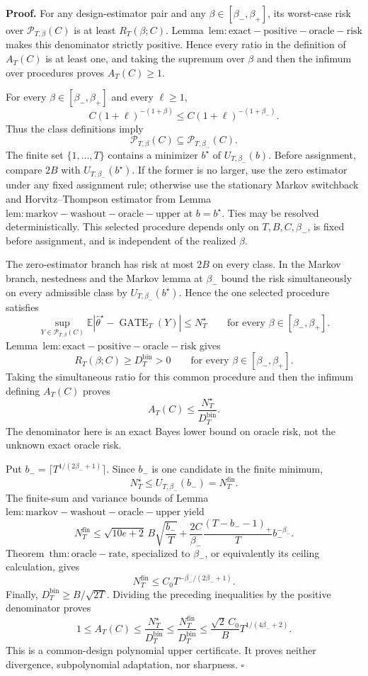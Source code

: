 \textbf{Proof.} For any design-estimator pair and any \(\beta\in[\beta_-,\beta_+]\), its worst-case risk over \(\mathcal P_{T,\beta}(C)\) is at least \(R_T(\beta;C)\). Lemma~\(\mathrm{lem:exact-positive-oracle-risk}\) makes this denominator strictly positive. Hence every ratio in the definition of \(A_T(C)\) is at least one, and taking the supremum over \(\beta\) and then the infimum over procedures proves \(A_T(C)\ge1\).

For every \(\beta\in[\beta_-,\beta_+]\) and every \(\ell\ge1\),
\[
C(1+\ell)^{-(1+\beta)}\le C(1+\ell)^{-(1+\beta_-)}.
\]
Thus the class definitions imply
\[
\mathcal P_{T,\beta}(C)\subseteq\mathcal P_{T,\beta_-}(C).
\]
The finite set \(\{1,\ldots,T\}\) contains a minimizer \(b^\star\) of \(U_{T,\beta_-}(b)\). Before assignment, compare \(2B\) with \(U_{T,\beta_-}(b^\star)\). If the former is no larger, use the zero estimator under any fixed assignment rule; otherwise use the stationary Markov switchback and Horvitz--Thompson estimator from Lemma~\(\mathrm{lem:markov-washout-oracle-upper}\) at \(b=b^\star\). Ties may be resolved deterministically. This selected procedure depends only on \(T,B,C,\beta_-\), is fixed before assignment, and is independent of the realized \(\beta\).

The zero-estimator branch has risk at most \(2B\) on every class. In the Markov branch, nestedness and the Markov lemma at \(\beta_-\) bound the risk simultaneously on every admissible class by \(U_{T,\beta_-}(b^\star)\). Hence the one selected procedure satisfies
\[
\sup_{Y\in\mathcal P_{T,\beta}(C)}
\mathbb E\left|\widehat\theta^\star-\operatorname{GATE}_T(Y)\right|
\le N_T^\star
\qquad\text{for every }\beta\in[\beta_-,\beta_+].
\]
Lemma~\(\mathrm{lem:exact-positive-oracle-risk}\) gives
\[
R_T(\beta;C)\ge D_T^{\mathrm{bin}}>0
\qquad\text{for every }\beta\in[\beta_-,\beta_+].
\]
Taking the simultaneous ratio for this common procedure and then the infimum defining \(A_T(C)\) proves
\[
A_T(C)\le\frac{N_T^\star}{D_T^{\mathrm{bin}}}.
\]
The denominator here is an exact Bayes lower bound on oracle risk, not the unknown exact oracle risk.

Put \(b_-=\lceil T^{1/(2\beta_-+1)}\rceil\). Since \(b_-\) is one candidate in the finite minimum,
\[
N_T^\star
\le U_{T,\beta_-}(b_-)
=N_T^{\mathrm{fin}}.
\]
The finite-sum and variance bounds of Lemma~\(\mathrm{lem:markov-washout-oracle-upper}\) yield
\[
N_T^{\mathrm{fin}}
\le \sqrt{10e+2}\,B\sqrt{\frac{b_-}{T}} +\frac{2C}{\beta_-}\frac{(T-b_--1)_+}{T}b_-^{-\beta_-}.
\]
Theorem~\(\mathrm{thm:oracle-rate}\), specialized to \(\beta_-\), or equivalently its ceiling calculation, gives
\[
N_T^{\mathrm{fin}}\le C_0T^{-\beta_-/(2\beta_-+1)}.
\]
Finally, \(D_T^{\mathrm{bin}}\ge B/\sqrt{2T}\). Dividing the preceding inequalities by the positive denominator proves
\[
1\le A_T(C)
\le\frac{N_T^\star}{D_T^{\mathrm{bin}}}
\le\frac{N_T^{\mathrm{fin}}}{D_T^{\mathrm{bin}}}
\le\frac{\sqrt2\,C_0}{B}T^{1/(4\beta_-+2)}.
\]
This is a common-design polynomial upper certificate. It proves neither divergence, subpolynomial adaptation, nor sharpness. \(\square\)